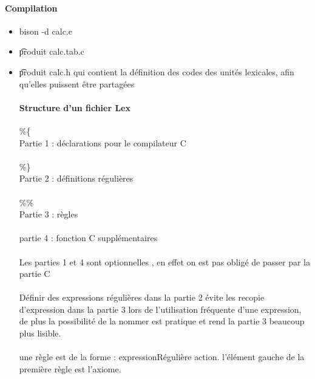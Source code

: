 \documentclass{article}
\begin{document}
\paragraph{Compilation}
\begin{itemize}
\item bison -d calc.c
\item \t produit calc.tab.c 
\item \t produit calc.h qui contient la définition des codes des unités lexicales, afin qu'elles puissent être partagées

\paragraph{Structure d'un fichier Lex} \%\{\\Partie 1 : déclarations pour le compilateur C\\\\\%\}\\Partie 2  :  définitions régulières\\\\\%\%\\Partie 3 :  règles\\\\partie 4 : fonction C supplémentaires\\\\Les parties 1 et 4 sont optionnelles , en effet on est pas obligé de passer par la partie C\\\\Définir des expressions régulières dans la partie  2 évite les recopie d'expression dans la partie 3 lors de l'utilisation fréquente d'une expression, de plus la possibilité de la nommer est pratique et rend la partie 3 beaucoup plus lisible.\\\\ une règle est de la forme : expressionRégulière {action}. l'élément gauche de la première règle est l'axiome.
\end{itemize}
\end{document}
